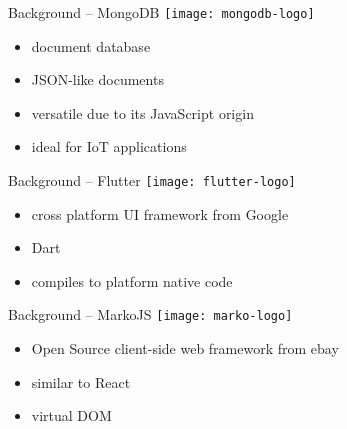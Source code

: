 \begin{frame}{Background -- MongoDB}
  \texttt{[image: mongodb-logo]}

  \vspace*{1.5em}

  \begin{itemize}
    \item document database
    \item JSON-like documents
    \item versatile due to its JavaScript origin
    \item ideal for IoT applications
  \end{itemize}
\end{frame}

\begin{frame}{Background -- Flutter}
  \texttt{[image: flutter-logo]}

  \vspace*{2em}

  \begin{itemize}
    \item cross platform UI framework from Google
    \item Dart
    \item compiles to platform native code
  \end{itemize}
\end{frame}

\begin{frame}{Background -- MarkoJS}
  \texttt{[image: marko-logo]}

  \vspace*{2em}

  \begin{itemize}
    \item Open Source client-side web framework from ebay
    \item similar to React
    \item virtual DOM
  \end{itemize}
\end{frame}
